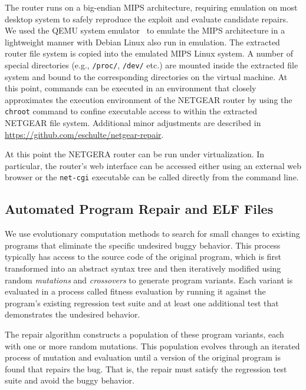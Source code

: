 \documentclass{sigcomm-alternate}
\begin{document}
{The router runs on a big-endian MIPS architecture, requiring emulation
on most desktop system to safely reproduce the exploit and evaluate
candidate repairs. We used the QEMU system
emulator~\cite{bellard2005qemu} to emulate the MIPS architecture in a
lightweight manner with Debian Linux also run in
emulation.  The extracted router file system is copied into the
emulated MIPS Linux system.  A number of special directories (e.g.,
\texttt{/proc/}, \texttt{/dev/} etc.) are mounted inside the extracted
file system and bound to the corresponding directories on the virtual
machine.  At this point, commands can be executed in an environment
that closely approximates the execution environment of the NETGEAR
router by using the \texttt{chroot} command to confine executable access
to within the extracted NETGEAR file system. Additional minor
adjustments are described in \url{https://github.com/eschulte/netgear-repair}.

At this point the NETGERA router can be run under virtualization.  In
particular, the router's web interface can be accessed either using an
external web browser or the \texttt{net-cgi} executable can be called
directly from the command line.

\subsection{Automated Program Repair and ELF Files}
\label{sec-3-2}

We use evolutionary computation methods to
\cite{forrest2009genetic,genprog-tse-journal,le2012representations,legoues2011systematicstudy}
search for small changes to existing programs that eliminate the
specific undesired buggy behavior.  This process typically has access
to the source code of the original program, which is first transformed
into an abstract syntax tree and then iteratively modified using
random \emph{mutations} and \emph{crossovers} to generate program
variants.  Each variant is evaluated in a process called fitness
evaluation by running it against the program's existing regression
test suite and at least one additional test that demonstrates the
undesired behavior.

The repair algorithm constructs a population of these
program variants, each with one or more random mutations.  
This population evolves through an iterated process of mutation and
evaluation until a version of the original program is found that
repairs the bug.  That is, the repair must satisfy the regression test
suite and avoid the buggy behavior.

}
\end{document}
